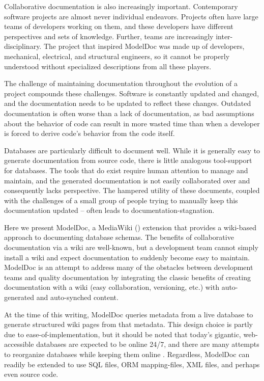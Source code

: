 \documentclass[nocopyrightspace]{acm_proc_article-sp}
\begin{document}
Collaborative documentation is also increasingly important. Contemporary software 
projects are almost never individual endeavors. Projects often have large teams of 
developers working on them, and these developers have different perspectives and sets 
of knowledge. Further, teams are increasingly inter-disciplinary. The project that inspired 
ModelDoc was made up of developers, mechanical, electrical, and structural engineers, 
so it cannot be properly understood without specialized descriptions from all these players.

The challenge of maintaining documentation throughout the evolution of a
project compounds these challenges.  Software is constantly updated and
changed, and the documentation needs to be updated to reflect these changes. 
Outdated documentation is often worse than a lack of documentation, as bad
assumptions about the behavior of code can result in more wasted time than
when a developer is forced to derive code's behavior from the code itself.

Databases are particularly difficult to document well.  While it is generally
easy to generate documentation from source code, there is little analogous
tool-support for databases.  The tools that do exist require human attention to
manage and maintain, and the generated documentation is not easily collaborated
over and consequently lacks perspective. The hampered utility of these
documents, coupled with the challenges of a small group of people trying to
manually keep this documentation updated -- often leads to
documentation-stagnation.

Here we present ModelDoc, a MediaWiki (\cite{web:mediawiki}) extension that
provides a wiki-based approach to documenting database schemas.  The benefits of collaborative
documentation via a wiki are well-known, but a development team cannot simply install a wiki
and expect documentation to suddenly become easy to maintain.  ModelDoc is an
attempt to address many of the obstacles between development teams and quality
documentation by integrating the classic benefits of creating documentation
with a wiki (easy collaboration, versioning, etc.) with auto-generated and
auto-synched content.

At the time of this writing, ModelDoc queries metadata from a live database to
generate structured wiki pages from that metadata.  This design choice is
partly due to ease-of-implementation, but it should be noted that today's
gigantic, web-accessible databases are expected to be online 24/7, and there
are many attempts to reorganize databases while keeping them online
\cite{sockut:reorganization} \cite{curino:evolution}.  Regardless, ModelDoc can
readily be extended to use SQL files, ORM mapping-files, XML files, and perhaps
even source code.
\end{document}
